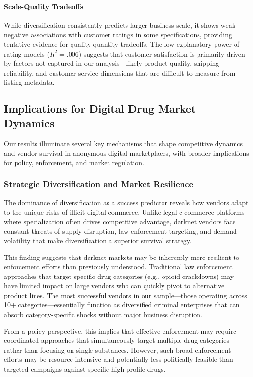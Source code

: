 \documentclass{article}
\begin{document}
\paragraph{Scale-Quality Tradeoffs} While diversification consistently predicts larger business scale, it shows weak negative associations with customer ratings in some specifications, providing tentative evidence for quality-quantity tradeoffs. The low explanatory power of rating models ($R^2 = .006$) suggests that customer satisfaction is primarily driven by factors not captured in our analysis—likely product quality, shipping reliability, and customer service dimensions that are difficult to measure from listing metadata.

\subsection{Implications for Digital Drug Market Dynamics}

Our results illuminate several key mechanisms that shape competitive dynamics and vendor survival in anonymous digital marketplaces, with broader implications for policy, enforcement, and market regulation.

\subsubsection{Strategic Diversification and Market Resilience}

The dominance of diversification as a success predictor reveals how vendors adapt to the unique risks of illicit digital commerce. Unlike legal e-commerce platforms where specialization often drives competitive advantage, darknet vendors face constant threats of supply disruption, law enforcement targeting, and demand volatility that make diversification a superior survival strategy. 

This finding suggests that darknet markets may be inherently more resilient to enforcement efforts than previously understood. Traditional law enforcement approaches that target specific drug categories (e.g., opioid crackdowns) may have limited impact on large vendors who can quickly pivot to alternative product lines. The most successful vendors in our sample—those operating across 10+ categories—essentially function as diversified criminal enterprises that can absorb category-specific shocks without major business disruption.

From a policy perspective, this implies that effective enforcement may require coordinated approaches that simultaneously target multiple drug categories rather than focusing on single substances. However, such broad enforcement efforts may be resource-intensive and potentially less politically feasible than targeted campaigns against specific high-profile drugs.
\end{document}
